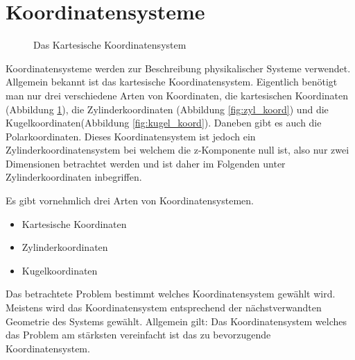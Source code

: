 \section{Koordinatensysteme}
\begin{figure}[h]
	\centering
	\caption[Kartesische Koordinaten]{Das Kartesische Koordinatensystem}
	\label{fig:kart_koord}
\end{figure}

Koordinatensysteme werden zur Beschreibung physikalischer Systeme verwendet. Allgemein bekannt ist das kartesische Koordinatensystem.
Eigentlich benötigt man nur drei verschiedene Arten von Koordinaten, die kartesischen Koordinaten (Abbildung \ref{fig:kart_koord}),  die Zylinderkoordinaten (Abbildung \ref{fig:zyl_koord}) und die Kugelkoordinaten(Abbildung \ref{fig:kugel_koord}). 
Daneben gibt es auch die Polarkoordinaten. Dieses Koordinatensystem ist jedoch ein Zylinderkoordinatensystem bei welchem die z-Komponente null ist, also nur zwei Dimensionen betrachtet werden und ist daher im Folgenden unter Zylinderkoordinaten inbegriffen. 

\begin{importantbox}
Es gibt vornehmlich drei Arten von Koordinatensystemen. 
\begin{itemize}
	\item Kartesische Koordinaten
	\item Zylinderkoordinaten
	\item Kugelkoordinaten
\end{itemize}
Das betrachtete Problem bestimmt welches Koordinatensystem gewählt wird. Meistens wird das Koordinatensystem entsprechend der nächstverwandten Geometrie des Systems gewählt. Allgemein gilt: Das Koordinatensystem welches das Problem am stärksten vereinfacht ist das zu bevorzugende Koordinatensystem.

\end{importantbox}


